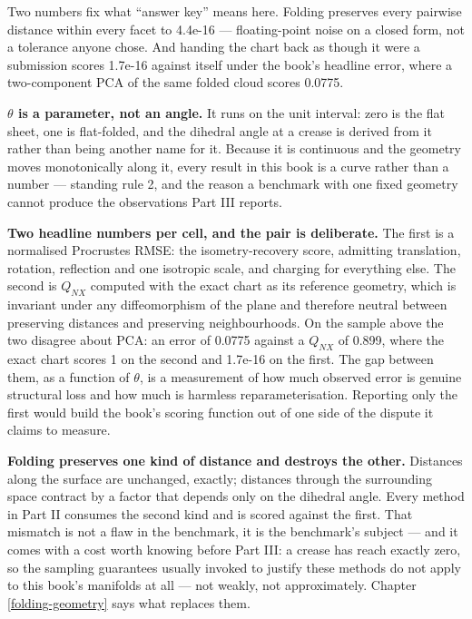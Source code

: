 \documentclass[
  british,
  a4paper,
]{book}
\begin{document}
Two numbers fix what ``answer key'' means here. Folding preserves every pairwise
distance within every facet to 4.4e-16 --- floating-point noise on a closed
form, not a tolerance anyone chose. And handing the chart back as though it were
a submission scores 1.7e-16 against itself under the book's
headline error, where a two-component PCA of the same folded cloud scores
0.0775.

\textbf{\(\theta\) is a parameter, not an angle.} It runs on the unit interval: zero is
the flat sheet, one is flat-folded, and the dihedral angle at a crease is
derived from it rather than being another name for it. Because it is continuous
and the geometry moves monotonically along it, every result in this book is a
curve rather than a number --- standing rule 2, and the reason a benchmark with
one fixed geometry cannot produce the observations Part III reports.

\textbf{Two headline numbers per cell, and the pair is deliberate.} The first is a
normalised Procrustes RMSE: the isometry-recovery score, admitting translation,
rotation, reflection and one isotropic scale, and charging for everything else.
The second is \(Q_{NX}\) computed with the exact chart as its reference geometry,
which is invariant under any diffeomorphism of the plane and therefore neutral
between preserving distances and preserving neighbourhoods. On the sample above
the two disagree about PCA: an error of 0.0775 against a
\(Q_{NX}\) of 0.899, where the exact chart scores
1 on the second and 1.7e-16 on the first.
The gap between them, as a function of \(\theta\), is a measurement of how much
observed error is genuine structural loss and how much is harmless
reparameterisation. Reporting only the first would build the book's scoring
function out of one side of the dispute it claims to measure.

\textbf{Folding preserves one kind of distance and destroys the other.} Distances
along the surface are unchanged, exactly; distances through the surrounding
space contract by a factor that depends only on the dihedral angle. Every method
in Part II consumes the second kind and is scored against the first. That
mismatch is not a flaw in the benchmark, it is the benchmark's subject --- and it
comes with a cost worth knowing before Part III: a crease has reach exactly
zero, so the sampling guarantees usually invoked to justify these methods do not
apply to this book's manifolds at all --- not weakly, not approximately. Chapter
\ref{folding-geometry} says what replaces them.
\end{document}
